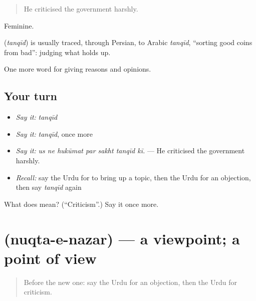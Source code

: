 \begin{quote}
He criticised the government harshly.
\end{quote}

Feminine.

\begin{cousinweb}
\textbf{} (\emph{tanqīd}) is usually traced, through Persian, to Arabic \emph{tanqīd}, \textquotedblleft{}sorting good coins from bad\textquotedblright{}: judging what holds up.
\end{cousinweb}

\begin{grammarlens}[title={What you've built}]
One more word for giving reasons and opinions.
\end{grammarlens}

\subsection*{Your turn}
\begin{itemize}
\raggedright
  \item \emph{Say it:} \emph{tanqīd}
  \item \emph{Say it:} \emph{tanqīd}, once more
  \item \emph{Say it:} \emph{us ne hukūmat par sakht tanqīd kī.} — He criticised the government harshly.
  \item \emph{Recall:} say the Urdu for to bring up a topic, then the Urdu for an objection, then say \emph{tanqīd} again
\end{itemize}

\begin{tcolorbox}[breakable,colback=teal!4,colframe=teal!35!black,title={Before you move on}]
What does  mean? (\textquotedblleft{}Criticism\textquotedblright{}.) Say it once more.
\end{tcolorbox}
\section[\texorpdfstring{\ur{نقطہ} \ur{نظر} (nuqta-e-nazar)}{نقطہ نظر (nuqta-e-nazar)}]{  (nuqta-e-nazar) — a viewpoint; a point of view}

\label{lesson:UR-C348-nuqta-e-nazar}



\begin{quote}
Before the new one: say the Urdu for an objection, then the Urdu for criticism.
\end{quote}


